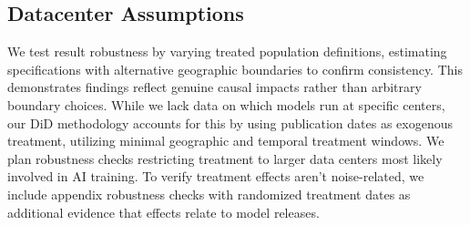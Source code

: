 \documentclass[sigconf,authordraft]{acmart}
\begin{document}
\subsection{Datacenter Assumptions}

We test result robustness by varying treated population definitions, estimating specifications with alternative geographic boundaries to confirm consistency. This demonstrates findings reflect genuine causal impacts rather than arbitrary boundary choices. While we lack data on which models run at specific centers, our DiD methodology accounts for this by using publication dates as exogenous treatment, utilizing minimal geographic and temporal treatment windows. We plan robustness checks restricting treatment to larger data centers most likely involved in AI training. To verify treatment effects aren't noise-related, we include appendix robustness checks with randomized treatment dates as additional evidence that effects relate to model releases. %
\end{document}
